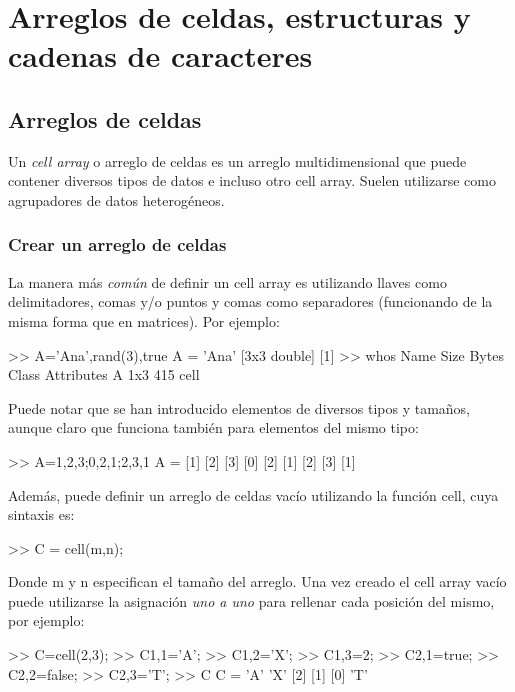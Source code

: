 \chapter{Arreglos de celdas, estructuras y cadenas de caracteres}

\section{Arreglos de celdas}

Un \emph{cell array} o arreglo de celdas es un arreglo multidimensional
que puede contener diversos tipos de datos e incluso otro cell array.
Suelen utilizarse como agrupadores de datos heterogéneos.

\subsection{Crear un arreglo de celdas}\label{crear-un-arreglo-de-celdas}

La manera más \emph{común} de definir un cell array es utilizando llaves
como delimitadores, comas y/o puntos y comas como separadores
(funcionando de la misma forma que en matrices). Por ejemplo:

\begin{matlab}
>> A={'Ana',rand(3),true}
A = 
    'Ana'    [3x3 double]    [1]
>> whos
  Name      Size            Bytes  Class    Attributes
  A         1x3               415  cell     
\end{matlab}

Puede notar que se han introducido elementos de diversos tipos y
tamaños, aunque claro que funciona también para elementos del mismo
tipo:

\begin{matlab}
>> A={1,2,3;0,2,1;2,3,1}
A = 
    [1]    [2]    [3]
    [0]    [2]    [1]
    [2]    [3]    [1]
\end{matlab}

Además, puede definir un arreglo de celdas vacío utilizando la función
cell, cuya sintaxis es:

\begin{matlab}
>> C = cell(m,n);
\end{matlab}

Donde m y n especifican el tamaño del arreglo. Una vez creado el cell
array vacío puede utilizarse la asignación \emph{uno a uno} para
rellenar cada posición del mismo, por ejemplo:

\begin{matlab}
>> C=cell(2,3);
>> C{1,1}='A';
>> C{1,2}='X';
>> C{1,3}=2;
>> C{2,1}=true;
>> C{2,2}=false;
>> C{2,3}='T';
>> C
C = 
    'A'    'X'    [2]
    [1]    [0]    'T'
\end{matlab}

